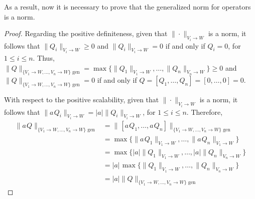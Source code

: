 As a result, now it is necessary to prove that the  generalized norm for operators is a norm.
\begin{proof}
  Regarding the positive definiteness,  given that $\|\cdot \|_{V_i \rightarrow W}$ is a norm, it follows that $\|Q_i\|_{V_i \rightarrow W} \geq 0$ and $\|Q_i\|_{V_i \rightarrow W} = 0$ if and only if $Q_i = 0$, for $1 \leq i \leq n $. Thus, $\|Q\|_{\{V_1\rightarrow W, \ldots, V_n\rightarrow W\} \text{ gen}} = \max \{\|Q_1\|_{V_1 \rightarrow W}, \ldots, \|Q_n\|_{V_n \rightarrow W}  \} \geq 0$ and $\|Q\|_{\{V_1\rightarrow W, \ldots, V_n\rightarrow W\} \text{ gen}} = 0$ if and only if $Q = [Q_1, \ldots, Q_n] = [0, \ldots, 0] = 0$.

  With respect to the positive scalability, given that $\|\cdot \|_{V_i \rightarrow W}$ is a norm, it follows that $\|a \hspace{1pt} Q_i\|_{V_i \rightarrow W} = |a| \|Q_i\|_{V_i \rightarrow W}$, for $1 \leq i \leq n$. Therefore,
  \begin{align*}
    \|a \hspace{1pt} Q\|_{\{V_1\rightarrow W, \ldots, V_n\rightarrow W\} \text{ gen}} & = \| \hspace{1pt} [a\hspace{1pt} Q_1, \ldots, a  \hspace{1pt}Q_n]\|_{\{V_1\rightarrow W, \ldots, V_n\rightarrow W\} \text{ gen}}\\
     &=\max \{\|a \hspace{1pt} Q_1\|_{V_1 \rightarrow W}, \ldots, \|a \hspace{1pt} Q_n\|_{V_1 \rightarrow W}  \} \\
    & = \max \{|a| \|Q_1\|_{V_1 \rightarrow W}, \ldots, |a| \|Q_n\|_{V_n \rightarrow W}  \} \\
    & = |a| \hspace{1pt} \max \{\|Q_1\|_{V_1 \rightarrow W}, \ldots, \|Q_n\|_{V_n \rightarrow W}  \} \\
    & = |a| \|Q\|_{\{V_1\rightarrow W, \ldots, V_n\rightarrow W\} \text{ gen}}
  \end{align*}


\end{proof}
